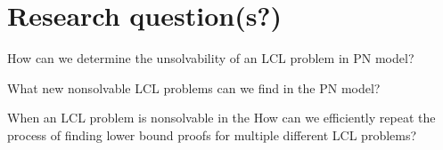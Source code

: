 
\section{Research question(s?)} \label{sec:research_question}

How can we determine the unsolvability of an LCL problem in PN model?

What new nonsolvable LCL problems can we find in the PN model? 

When an LCL problem is nonsolvable in the 
How can we efficiently repeat the process of finding lower bound proofs for multiple different LCL problems?


